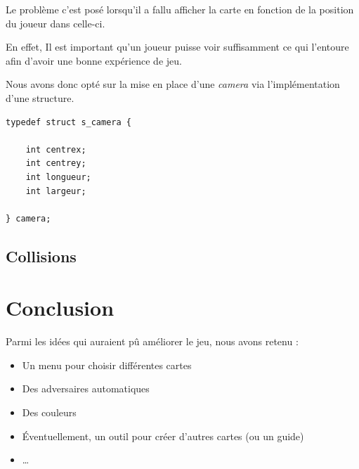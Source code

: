 \documentclass[12pt]{article}
\begin{document}
			Le problème c'est posé lorsqu'il a fallu afficher la carte en fonction de la position du joueur dans celle-ci.

			En effet, Il est important qu'un joueur puisse voir suffisamment ce qui l'entoure afin d'avoir une bonne expérience de jeu.

			Nous avons donc opté sur la mise en place d'une \textit{camera} via l'implémentation d'une structure.
			\begin{lstlisting}[title=Structure Camera]
typedef struct s_camera {
	
	int centrex;
	int centrey;
	int longueur;
	int largeur;
				
} camera;
			\end{lstlisting}

		\subsection{Collisions}
		
		
		

	\section{Conclusion}

	Parmi les idées qui auraient pû améliorer le jeu, nous avons retenu :
	\begin{itemize}
		\item Un menu pour choisir différentes cartes
		\item Des adversaires automatiques
		\item Des couleurs
		\item Éventuellement, un outil pour créer d'autres cartes (ou un guide)
		\item \dots
	\end{itemize}
		
\end{document}
